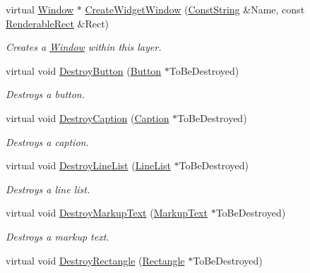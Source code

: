 \begin{DoxyCompactItemize}
virtual \hyperlink{classMezzanine_1_1UI_1_1Window}{Window} $\ast$ \hyperlink{classMezzanine_1_1UI_1_1Layer_a6616d0c480ac41748f10f77789eb52ee}{CreateWidgetWindow} (\hyperlink{namespaceMezzanine_a63cd699ac54b73953f35ec9cfc05e506}{ConstString} \&Name, const \hyperlink{structMezzanine_1_1UI_1_1RenderableRect}{RenderableRect} \&Rect)
\begin{DoxyCompactList}\small\item\em Creates a \hyperlink{classMezzanine_1_1UI_1_1Window}{Window} within this layer. \item\end{DoxyCompactList}\item 
virtual void \hyperlink{classMezzanine_1_1UI_1_1Layer_adfc40e5ca5a41cc5ab76303432669e8c}{DestroyButton} (\hyperlink{classMezzanine_1_1UI_1_1Button}{Button} $\ast$ToBeDestroyed)
\begin{DoxyCompactList}\small\item\em Destroys a button. \item\end{DoxyCompactList}\item 
virtual void \hyperlink{classMezzanine_1_1UI_1_1Layer_affc70067d7d58d342f3d81bae1b059af}{DestroyCaption} (\hyperlink{classMezzanine_1_1UI_1_1Caption}{Caption} $\ast$ToBeDestroyed)
\begin{DoxyCompactList}\small\item\em Destroys a caption. \item\end{DoxyCompactList}\item 
virtual void \hyperlink{classMezzanine_1_1UI_1_1Layer_a6886628b065bf846061b4dea1726ad57}{DestroyLineList} (\hyperlink{classMezzanine_1_1UI_1_1LineList}{LineList} $\ast$ToBeDestroyed)
\begin{DoxyCompactList}\small\item\em Destroys a line list. \item\end{DoxyCompactList}\item 
virtual void \hyperlink{classMezzanine_1_1UI_1_1Layer_a7f53065d958576cda9322520c71be80f}{DestroyMarkupText} (\hyperlink{classMezzanine_1_1UI_1_1MarkupText}{MarkupText} $\ast$ToBeDestroyed)
\begin{DoxyCompactList}\small\item\em Destroys a markup text. \item\end{DoxyCompactList}\item 
virtual void \hyperlink{classMezzanine_1_1UI_1_1Layer_a3ad9ddd61bb7bd8ae418f7df8bed1ff5}{DestroyRectangle} (\hyperlink{classMezzanine_1_1UI_1_1Rectangle}{Rectangle} $\ast$ToBeDestroyed)

\end{DoxyCompactItemize}
